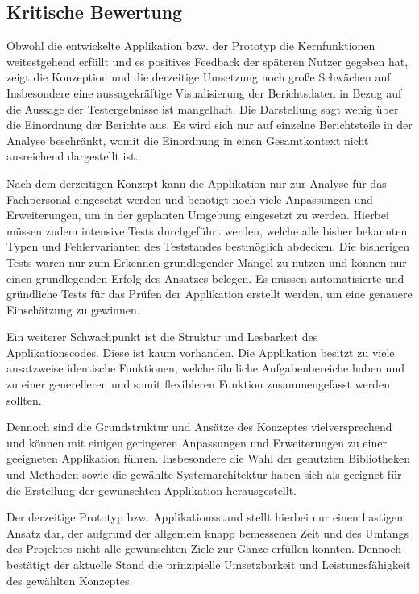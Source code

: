 \subsection{Kritische Bewertung}
\label{subsec:kritische-bewertung}

Obwohl die entwickelte Applikation bzw. der Prototyp die Kernfunktionen weitestgehend erfüllt und es positives Feedback der späteren Nutzer gegeben hat,
zeigt die Konzeption und die derzeitige Umsetzung noch große Schwächen auf.
Insbesondere eine aussagekräftige Visualisierung der Berichtsdaten in Bezug auf die Aussage der Testergebnisse ist mangelhaft.
Die Darstellung sagt wenig über die Einordnung der Berichte aus.
Es wird sich nur auf einzelne Berichtsteile in der Analyse beschränkt, womit die Einordnung in einen Gesamtkontext nicht ausreichend dargestellt ist.

Nach dem derzeitigen Konzept kann die Applikation nur zur Analyse für das Fachpersonal eingesetzt werden und benötigt noch viele Anpassungen und Erweiterungen, um in der geplanten Umgebung eingesetzt zu werden.
Hierbei müssen zudem intensive Tests durchgeführt werden, welche alle bisher bekannten Typen und Fehlervarianten des Teststandes bestmöglich abdecken.
Die bisherigen Tests waren nur zum Erkennen grundlegender Mängel zu nutzen und können nur einen grundlegenden Erfolg des Ansatzes belegen.
Es müssen automatisierte und gründliche Tests für das Prüfen der Applikation erstellt werden, um eine genauere Einschätzung zu gewinnen.

Ein weiterer Schwachpunkt ist die Struktur und Lesbarkeit des Applikationscodes. Diese ist kaum vorhanden.
Die Applikation besitzt zu viele ansatzweise identische Funktionen, welche ähnliche Aufgabenbereiche haben und zu einer generelleren und somit flexibleren Funktion zusammengefasst werden sollten.

Dennoch sind die Grundstruktur und Ansätze des Konzeptes vielversprechend und können mit einigen geringeren Anpassungen und Erweiterungen zu einer geeigneten Applikation führen.
Insbesondere die Wahl der genutzten Bibliotheken und Methoden sowie die gewählte Systemarchitektur haben sich als geeignet für die Erstellung der gewünschten Applikation herausgestellt.

Der derzeitige Prototyp bzw. Applikationsstand stellt hierbei nur einen hastigen Ansatz dar, der aufgrund der allgemein knapp bemessenen Zeit und des Umfangs des Projektes nicht alle gewünschten Ziele
zur Gänze erfüllen konnten.
Dennoch bestätigt der aktuelle Stand die prinzipielle Umsetzbarkeit und Leistungsfähigkeit des gewählten Konzeptes.








